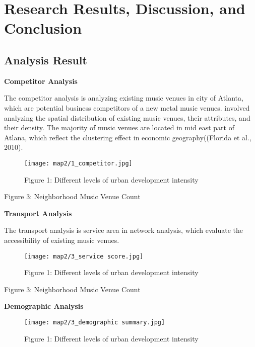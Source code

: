 \documentclass[11pt]{article}
\begin{document}
\section{Research Results, Discussion, and Conclusion}
\subsection{Analysis Result}

\textbf{Competitor Analysis}

The competitor analysis is analyzing existing music venues in city of Atlanta, which are potential business competitors of a new metal music venues.
involved analyzing the spatial distribution of existing music venues, their attributes, and their density. 
The majority of music venues are located in mid east part of Atlana, which reflect the clustering effect in economic geography((Florida et al., 2010).

\begin{figure}[H]
\begin{center}
\centering
\texttt{[image: map2/1\_competitor.jpg]}
\caption{Figure 1: Different levels of urban development intensity}
\label{fig:figure1}
\end{center}
\end{figure}

\begin{center}
\centering
Figure 3: Neighborhood Music Venue Count
\end{center}


\textbf{Transport Analysis}

The transport analysis is service area in network analysis, which evaluate the accessibility of existing music venues. 
\begin{figure}[H]
\begin{center}
\centering
\texttt{[image: map2/3\_service score.jpg]}
\caption{Figure 1: Different levels of urban development intensity}
\label{fig:figure1}
\end{center}
\end{figure}

\begin{center}
\centering
Figure 3: Neighborhood Music Venue Count
\end{center}


\textbf{Demographic Analysis}



\begin{figure}[H]
\begin{center}
\centering
\texttt{[image: map2/3\_demographic summary.jpg]}
\caption{Figure 1: Different levels of urban development intensity}
\label{fig:figure1}
\end{center}
\end{figure}
\end{document}
